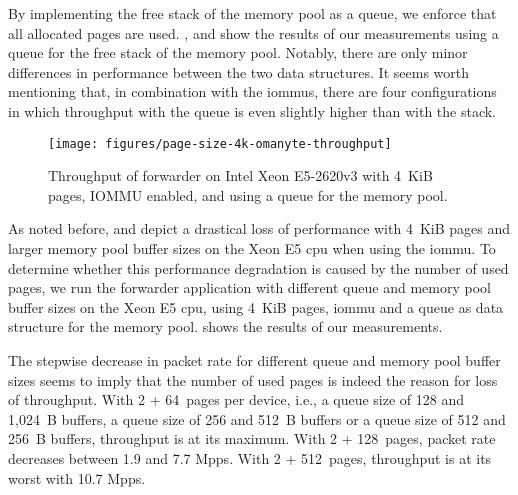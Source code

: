 By implementing the free stack of the memory pool as a queue, we enforce that
all allocated pages are used. ,
 and
 show the results of our measurements
using a queue for the free stack of the memory pool. Notably, there are only
minor differences in performance between the two data structures. It seems worth
mentioning that, in combination with the \acp{iommu}, there are four
configurations in which throughput with the queue is even slightly higher than
with the stack.

\begin{figure}%
	\centering
    \texttt{[image: figures/page-size-4k-omanyte-throughput]}

    \caption{Throughput of forwarder on Intel Xeon E5-2620v3 with 4~KiB pages,
    IOMMU enabled, and using a queue for the memory pool.}
	\label{fig:page-size-4k-omanyte}
\end{figure}

As noted before,  and
 depict a drastical loss of performance
with 4~KiB pages and larger memory pool buffer sizes on the Xeon E5 \ac{cpu}
when using the \ac{iommu}. To determine whether this performance degradation is
caused by the number of used pages, we run the forwarder application with
different queue and memory pool buffer sizes on the Xeon E5 \ac{cpu}, using
4~KiB pages, \ac{iommu} and a queue as data structure for the memory pool.
 shows the results of our measurements.

The stepwise decrease in packet rate for different queue and memory pool buffer
sizes seems to imply that the number of used pages is indeed the reason for loss
of throughput. With 2 + 64~pages per device, i.e., a queue size of 128 and
1,024~B buffers, a queue size of 256 and 512~B buffers or a queue size of 512
and 256~B buffers, throughput is at its maximum. With 2 + 128~pages, packet rate
decreases between 1.9 and 7.7 Mpps. With 2 + 512~pages, throughput is at its
worst with 10.7 Mpps.

